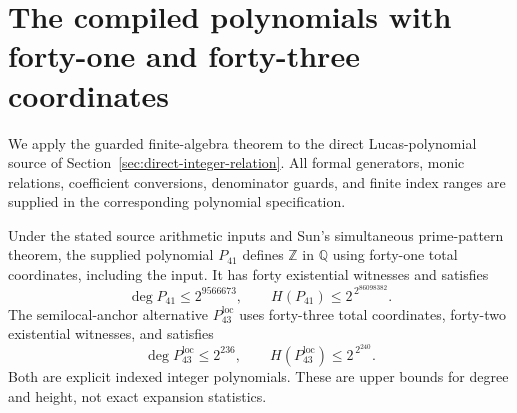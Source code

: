 \section{The compiled polynomials with forty-one and forty-three coordinates}
\label{sec:p3-compiled-polynomials}

We apply the guarded finite-algebra theorem to the direct
Lucas-polynomial source of Section~\ref{sec:direct-integer-relation}.
All formal generators, monic relations, coefficient conversions,
denominator guards, and finite index ranges are supplied in the
corresponding polynomial specification.

\begin{theorem}\label{thm:p3-polynomial41}
Under the stated source arithmetic inputs and Sun's simultaneous
prime-pattern theorem, the supplied polynomial $P_{41}$ defines
$\mathbb Z$ in $\mathbb Q$ using forty-one total coordinates,
including the input. It has forty existential witnesses and satisfies
\[
        \deg P_{41}\le 2^{9566673},
        \qquad H(P_{41})\le 2^{\,2^{86098382}}.
\]
The semilocal-anchor alternative $P_{43}^{\mathrm{loc}}$ uses
forty-three total coordinates, forty-two existential witnesses, and
satisfies
\[
        \deg P_{43}^{\mathrm{loc}}\le 2^{236},
        \qquad H(P_{43}^{\mathrm{loc}})\le 2^{\,2^{240}}.
\]
Both are explicit indexed integer polynomials. These are upper bounds
for degree and height, not exact expansion statistics.
\end{theorem}
